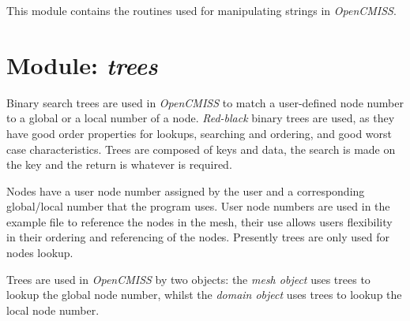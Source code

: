 This module contains the routines used for manipulating strings in 
\emph{OpenCMISS}.


\section{Module: \emph{trees}}
\label{sec:trees}

Binary search trees are used in \emph{OpenCMISS} to match a user-defined node 
number to a global or a local number of a node. \emph{Red-black} binary trees 
are used, as they have good order properties for lookups, searching and ordering, 
and good worst case characteristics. Trees are composed of keys and data, the 
search is made on the key and the return is whatever is required.

Nodes have a user node number assigned by the user and a corresponding 
global/local number that the program uses. User node numbers are used in the 
example file to reference the nodes in the mesh, their use allows users flexibility 
in their ordering and referencing of the nodes. Presently trees are only used for 
nodes lookup.

Trees are used in \emph{OpenCMISS} by two objects: the \emph{mesh object} uses 
trees to lookup the global node number, whilst the \emph{domain object} uses trees 
to lookup the local node number.
